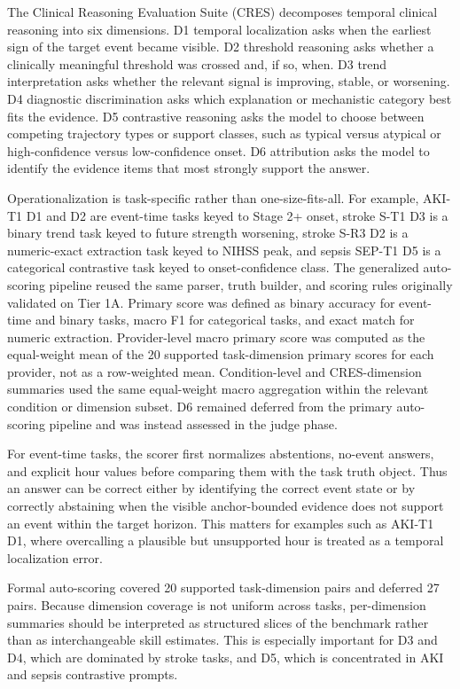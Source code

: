 \documentclass[pdflatex,sn-nature]{sn-jnl}
\begin{document}
The Clinical Reasoning Evaluation Suite (CRES) decomposes temporal clinical reasoning into six dimensions. D1 temporal localization asks when the earliest sign of the target event became visible. D2 threshold reasoning asks whether a clinically meaningful threshold was crossed and, if so, when. D3 trend interpretation asks whether the relevant signal is improving, stable, or worsening. D4 diagnostic discrimination asks which explanation or mechanistic category best fits the evidence. D5 contrastive reasoning asks the model to choose between competing trajectory types or support classes, such as typical versus atypical or high-confidence versus low-confidence onset. D6 attribution asks the model to identify the evidence items that most strongly support the answer.

Operationalization is task-specific rather than one-size-fits-all. For example, AKI-T1 D1 and D2 are event-time tasks keyed to Stage 2+ onset, stroke S-T1 D3 is a binary trend task keyed to future strength worsening, stroke S-R3 D2 is a numeric-exact extraction task keyed to NIHSS peak, and sepsis SEP-T1 D5 is a categorical contrastive task keyed to onset-confidence class. The generalized auto-scoring pipeline reused the same parser, truth builder, and scoring rules originally validated on Tier 1A. Primary score was defined as binary accuracy for event-time and binary tasks, macro F1 for categorical tasks, and exact match for numeric extraction. Provider-level macro primary score was computed as the equal-weight mean of the 20 supported task-dimension primary scores for each provider, not as a row-weighted mean. Condition-level and CRES-dimension summaries used the same equal-weight macro aggregation within the relevant condition or dimension subset. D6 remained deferred from the primary auto-scoring pipeline and was instead assessed in the judge phase.

For event-time tasks, the scorer first normalizes abstentions, no-event answers, and explicit hour values before comparing them with the task truth object. Thus an answer can be correct either by identifying the correct event state or by correctly abstaining when the visible anchor-bounded evidence does not support an event within the target horizon. This matters for examples such as AKI-T1 D1, where overcalling a plausible but unsupported hour is treated as a temporal localization error.

Formal auto-scoring covered 20 supported task-dimension pairs and deferred 27 pairs. Because dimension coverage is not uniform across tasks, per-dimension summaries should be interpreted as structured slices of the benchmark rather than as interchangeable skill estimates. This is especially important for D3 and D4, which are dominated by stroke tasks, and D5, which is concentrated in AKI and sepsis contrastive prompts.
\end{document}
